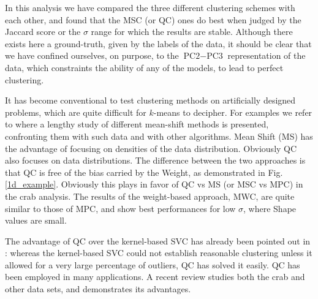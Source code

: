 \documentclass[preprint,12pt]{elsarticle}
\begin{document}
In this analysis we have compared the three different clustering schemes with each other, and found that the MSC (or QC) ones do best when judged by the Jaccard score or the $\sigma$ range for which the results are stable. Although there exists here a ground-truth, given by the labels of the data, it should be clear that we have confined ourselves, on purpose, to the $\text{PC2}-\text{PC3}$ representation of the data, which constraints the ability of any of the models, to lead to perfect clustering.

It has become conventional to test clustering methods on artificially designed problems, which are quite difficult for $k$-means to decipher. For examples we refer to \cite{Carreira2015clustering} where a lengthy study of different mean-shift methods is presented, confronting them with such data and with other algorithms. Mean Shift (MS) has the advantage of focusing on densities of the data distribution. Obviously QC also focuses on data distributions. The difference between the two approaches is that QC is free of the bias carried by the Weight, as demonstrated in Fig. \ref{1d_example}. Obviously this plays in favor of QC vs MS (or MSC vs MPC) in the crab analysis. The results of the weight-based approach, MWC, are quite similar to those of MPC, and show best performances for low $\sigma$, where Shape values are small.

The advantage of QC \cite{horn2001} over the kernel-based SVC \cite{ben2001} has already been pointed out in \cite{horn2001}: whereas the kernel-based SVC could not establish reasonable clustering unless it allowed for a very large percentage of outliers, QC has solved it easily. QC has been employed in many applications. A recent review \cite{scott2017data} studies both the crab and other data sets, and demonstrates its advantages.
\end{document}
